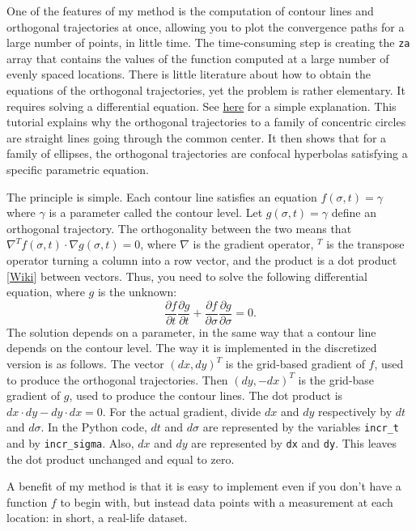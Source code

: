 \documentclass[oneside,10pt]{book}
\begin{document}
One of the features of my method is the computation of contour lines and orthogonal trajectories at once, allowing you to plot the convergence paths for a large number of points, in little time. The time-consuming step is creating the \texttt{za} array that contains the values of the function  computed at a large number of evenly spaced locations. There is little literature about how to obtain the equations of the orthogonal trajectories, yet the problem is rather elementary. It requires solving a differential equation. See \href{https://math24.net/orthogonal-trajectories.html}{here} for a simple explanation. This tutorial explains  why the orthogonal trajectories to a family of concentric circles are straight lines going through the common center. It then shows that for a family of ellipses, the orthogonal trajectories are confocal hyperbolas satisfying a specific parametric equation.

The principle is simple. Each contour line satisfies an equation $f(\sigma, t) =\gamma$ where $\gamma$ is a parameter called the
 \textcolor{index}{contour level}. Let $g(\sigma,t) = \gamma$ define an orthogonal trajectory. The orthogonality between the two means that $\nabla^T f(\sigma, t) \cdot  \nabla g(\sigma, t) = 0$, where $\nabla$ is the gradient operator, $^T$ is the transpose operator turning a column into a row vector, and the product is a dot product [\href{https://en.wikipedia.org/wiki/Dot_product}{Wiki}] between vectors.
Thus, you need to solve the following differential equation, where $g$ is the unknown:
$$
 \frac{\partial f}{\partial t} \frac{\partial g}{\partial t} + \frac{\partial f}{\partial \sigma} \frac{\partial g}{\partial \sigma} = 0.
$$
The solution depends on a parameter, in the same way that a contour line depends on the contour level. The way it is implemented in the discretized version is as follows. The vector $(dx,dy)^T$
is the grid-based  gradient of $f$, used to produce the orthogonal trajectories. Then
  $(dy, -dx)^T$ is the grid-base gradient of $g$, used to produce the contour lines. The dot product is $dx \cdot dy - dy \cdot dx = 0$. For the actual gradient, divide $dx$ and $dy$ respectively by  $dt$ and $d\sigma$.
In the Python code,  $dt$ and $d\sigma$ are represented by the variables \texttt{incr\_t} and by \texttt{incr\_sigma}.
Also, $dx$ and $dy$ are represented by \texttt{dx} and \texttt{dy}. This leaves the dot product unchanged and equal to zero.

A benefit of my method is that it is easy to implement even if you don't have a function $f$ to begin with, but instead data points with a measurement at each location: in short, a real-life dataset.
\end{document}

